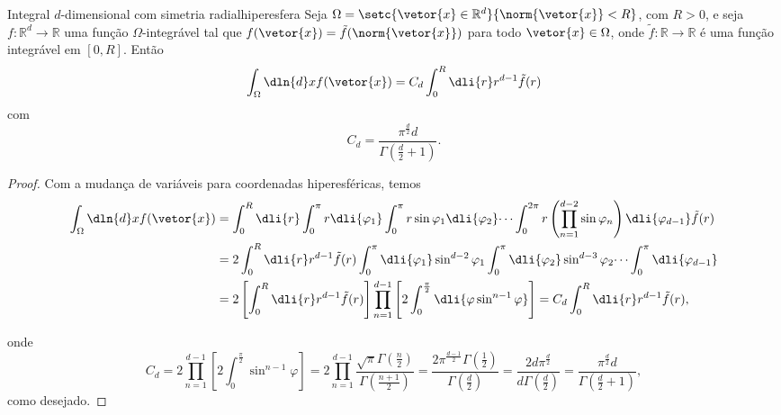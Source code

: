 \begin{lemma}{Integral \(d\)-dimensional com simetria radial}{hiperesfera}
    Seja \(\Omega = \setc{\vetor{x} \in \mathbb{R}^d}{\norm{\vetor{x}} < R}\), com \(R > 0\), e seja \(f : \mathbb{R}^d \to \mathbb{R}\) uma função \(\Omega\)-integrável tal que \(f(\vetor{x}) = \tilde{f}(\norm{\vetor{x}})\) para todo \(\vetor{x} \in \Omega\), onde \(\tilde{f} : \mathbb{R} \to \mathbb{R}\) é uma função integrável em \([0, R]\). Então
    \begin{equation*}
        \int_{\Omega} \dln{d}x f(\vetor{x}) = C_d \int_0^R \dli{r} r^{d - 1}\tilde{f}(r)
    \end{equation*}
    com
    \begin{equation*}
        C_d = \frac{\pi^{\frac{d}{2}}d}{\Gamma(\frac{d}{2}+1)}.
    \end{equation*}
\end{lemma}
\begin{proof}
    Com a mudança de variáveis para coordenadas hiperesféricas, temos
    \begin{align*}
        \int_{\Omega} \dln{d}xf(\vetor{x}) &= \int_0^R \dli{r} \int_0^{\pi} r \dli{\varphi_1} \int_0^{\pi} r\sin\varphi_1 \dli{\varphi_2} \dots \int_0^{2\pi} r \left(\prod_{n = 1}^{d-2} \sin\varphi_n\right)\dli{\varphi_{d-1}} \tilde{f}(r)\\
                                           &= 2\int_{0}^R \dli{r} r^{d-1} \tilde{f}(r) \int_0^\pi \dli{\varphi_1} \sin^{d-2}\varphi_1 \int_0^\pi \dli{\varphi_2}\sin^{d - 3}\varphi_2 \dots \int_0^\pi \dli{\varphi_{d-1}}\\
                                           &= 2\left[\int_0^R \dli{r} r^{d-1} \tilde{f}(r)\right] \prod_{n=1}^{d-1} \left[2\int_0^{\frac{\pi}{2}}\dli{\varphi \sin^{n-1}\varphi}\right] = C_d \int_0^R \dli{r} r^{d-1} \tilde{f}(r),
    \end{align*}


    onde
    \begin{equation*}
        C_d = 2 \prod_{n=1}^{d-1} \left[2 \int_0^{\frac{\pi}{2}} \sin^{n - 1}\varphi\right] = 2\prod_{n=1}^{d-1}\frac{\sqrt{\pi} \Gamma(\frac{n}{2})}{\Gamma(\frac{n+1}{2})} = \frac{2 \pi^{\frac{d-1}{2}}\Gamma(\frac12)}{\Gamma(\frac{d}{2})} = \frac{2d \pi^{\frac{d}{2}}}{d \Gamma(\frac{d}{2})} = \frac{\pi^{\frac{d}{2}}d}{\Gamma(\frac{d}{2} + 1)},
    \end{equation*}
    como desejado.
\end{proof}

